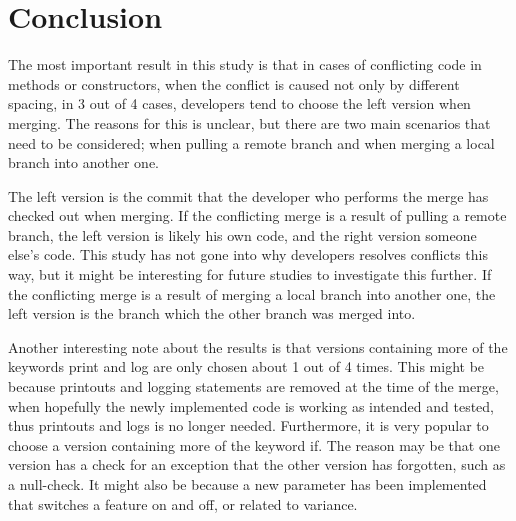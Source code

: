 \chapter{Conclusion}
The most important result in this study is that in cases of conflicting code in methods or constructors, when the conflict is caused not only by different spacing, in 3 out of 4 cases, developers tend to choose the left version when merging. The reasons for this is unclear, but there are two main scenarios that need to be considered; when pulling a remote branch and when merging a local branch into another one.

The left version is the commit that the developer who performs the merge has checked out when merging. If the conflicting merge is a result of pulling a remote branch, the left version is likely his own code, and the right version someone else’s code. This study has not gone into why developers resolves conflicts this way, but it might be interesting for future studies to investigate this further. If the conflicting merge is a result of merging a local branch into another one, the left version is the branch which the other branch was merged into. 

Another interesting note about the results is that versions containing more of the keywords print and log are only chosen about 1 out of 4 times. This might be because printouts and logging statements are removed at the time of the merge, when hopefully the newly implemented code is working as intended and tested, thus printouts and logs is no longer needed. Furthermore, it is very popular to choose a version containing more of the keyword if. The reason may be that one version has a check for an exception that the other version has forgotten, such as a null-check. It might also be because a new parameter has been implemented that switches a feature on and off, or related to variance.


